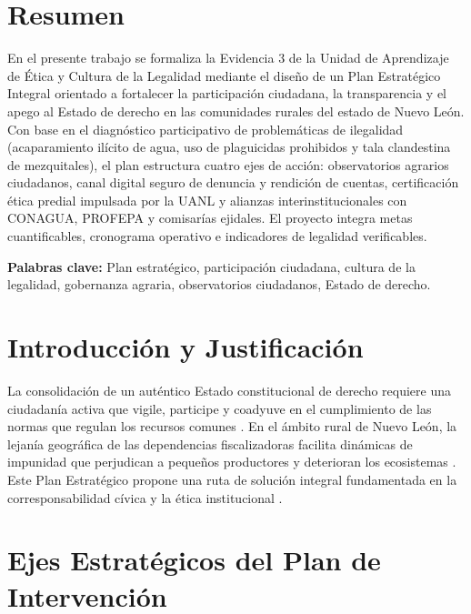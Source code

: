\documentclass[spanish,letterpaper,oneside]{article}
\begin{document}
\hypersetup{pageanchor=false}
\begingroup
\fontsize{14}{17}\selectfont
\renewcommand{\Huge}{\fontsize{14}{17}\selectfont\bfseries}
\renewcommand{\large}{\fontsize{14}{17}\selectfont}
\templatePortrait
\clearpage
\endgroup
\hypersetup{pageanchor=true}
\templatePagecfg
\singlespacing
\setlength{\tabcolsep}{8pt}
\renewcommand{\arraystretch}{1.18}

\section*{Resumen}
En el presente trabajo se formaliza la Evidencia 3 de la Unidad de Aprendizaje de Ética y Cultura de la Legalidad mediante el diseño de un Plan Estratégico Integral orientado a fortalecer la participación ciudadana, la transparencia y el apego al Estado de derecho en las comunidades rurales del estado de Nuevo León. Con base en el diagnóstico participativo de problemáticas de ilegalidad (acaparamiento ilícito de agua, uso de plaguicidas prohibidos y tala clandestina de mezquitales), el plan estructura cuatro ejes de acción: observatorios agrarios ciudadanos, canal digital seguro de denuncia y rendición de cuentas, certificación ética predial impulsada por la UANL y alianzas interinstitucionales con CONAGUA, PROFEPA y comisarías ejidales. El proyecto integra metas cuantificables, cronograma operativo e indicadores de legalidad verificables.

\vspace{0.4cm}
\noindent\textbf{Palabras clave:} Plan estratégico, participación ciudadana, cultura de la legalidad, gobernanza agraria, observatorios ciudadanos, Estado de derecho.

\section{Introducción y Justificación}
La consolidación de un auténtico Estado constitucional de derecho requiere una ciudadanía activa que vigile, participe y coadyuve en el cumplimiento de las normas que regulan los recursos comunes \parencite{cndh2020}. En el ámbito rural de Nuevo León, la lejanía geográfica de las dependencias fiscalizadoras facilita dinámicas de impunidad que perjudican a pequeños productores y deterioran los ecosistemas \parencite{ley_agraria2022}. Este Plan Estratégico propone una ruta de solución integral fundamentada en la corresponsabilidad cívica y la ética institucional \parencite{cortina2013}.

\section{Ejes Estratégicos del Plan de Intervención}
\end{document}
